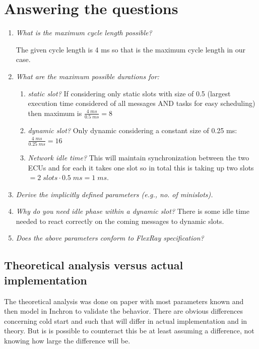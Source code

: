 \section{Answering the questions}


\begin{enumerate}
	\item \textit{What is the maximum cycle length possible? }
	
	The given cycle length is 4 ms so that is the maximum cycle length in our case.
	
	\item \textit{What are the maximum possible durations for:}
	
	\begin{enumerate}
			\item \textit{static slot?} If considering only static slots with size of 0.5 (largest execution time considered of all messages AND tasks for easy scheduling) then maximum is $\frac{4 \; ms}{0.5 \; ms} = 8$
			
			\item\textit{ dynamic slot? }Only dynamic considering a constant size of 0.25 ms: $\frac{4 \; ms}{0.25 \; ms} = 16$
			
			\item \textit{Network idle time? }This will maintain synchronization between the two ECUs and for each it takes one slot so in total this is taking up two slots $= 2 \; slots \cdot 0.5 \; ms = 1 \; ms$.
	\end{enumerate}	
	
	\item\textit{ Derive the implicitly defined parameters (e.g., no. of minislots).}
	
	\item\textit{ Why do you need idle phase within a dynamic slot?} There is some idle time needed to react correctly on the coming messages to dynamic slots.
	
	\item \textit{Does the above parameters conform to FlexRay specification?}
	
\end{enumerate}


\subsection{Theoretical analysis versus actual implementation}
The theoretical analysis was done on paper with most parameters known and then model in Inchron to validate the behavior. There are obvious differences concerning cold start and such that will differ in actual implementation and in theory. But is is possible to counteract this be at least assuming a difference, not knowing how large the difference will be.

